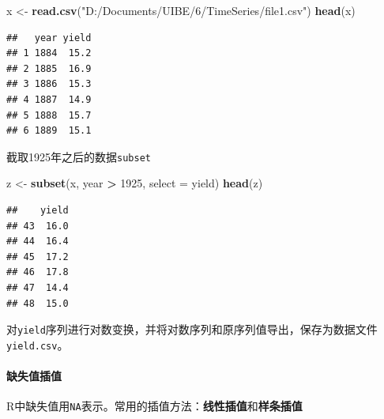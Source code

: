 \documentclass[]{article}
\newenvironment{Shaded}{\begin{snugshade}}{\end{snugshade}}
\newcommand{\CommentTok}[1]{\textcolor[rgb]{0.56,0.35,0.01}{\textit{#1}}}
\newcommand{\DataTypeTok}[1]{\textcolor[rgb]{0.13,0.29,0.53}{#1}}
\newcommand{\DecValTok}[1]{\textcolor[rgb]{0.00,0.00,0.81}{#1}}
\newcommand{\KeywordTok}[1]{\textcolor[rgb]{0.13,0.29,0.53}{\textbf{#1}}}
\newcommand{\NormalTok}[1]{#1}
\newcommand{\OperatorTok}[1]{\textcolor[rgb]{0.81,0.36,0.00}{\textbf{#1}}}
\newcommand{\StringTok}[1]{\textcolor[rgb]{0.31,0.60,0.02}{#1}}
\let\oldparagraph\paragraph
\renewcommand{\paragraph}[1]{\oldparagraph{#1}\mbox{}}
\begin{document}
\begin{Shaded}
\begin{Highlighting}[]
\NormalTok{x <-}\StringTok{ }\KeywordTok{read.csv}\NormalTok{(}\StringTok{"D:/Documents/UIBE/6/TimeSeries/file1.csv"}\NormalTok{)}
\KeywordTok{head}\NormalTok{(x)}
\end{Highlighting}
\end{Shaded}

\begin{verbatim}
##   year yield
## 1 1884  15.2
## 2 1885  16.9
## 3 1886  15.3
## 4 1887  14.9
## 5 1888  15.7
## 6 1889  15.1
\end{verbatim}

截取1925年之后的数据\texttt{subset}

\begin{Shaded}
\begin{Highlighting}[]
\NormalTok{z <-}\StringTok{ }\KeywordTok{subset}\NormalTok{(x, year }\OperatorTok{>}\StringTok{ }\DecValTok{1925}\NormalTok{, }\DataTypeTok{select =}\NormalTok{ yield)}
\KeywordTok{head}\NormalTok{(z)}
\end{Highlighting}
\end{Shaded}

\begin{verbatim}
##    yield
## 43  16.0
## 44  16.4
## 45  17.2
## 46  17.8
## 47  14.4
## 48  15.0
\end{verbatim}

对\texttt{yield}序列进行对数变换，并将对数序列和原序列值导出，保存为数据文件\texttt{yield.csv}。

\begin{Shaded}
\end{Shaded}

\hypertarget{ux7f3aux5931ux503cux63d2ux503c}{%
\paragraph{缺失值插值}\label{ux7f3aux5931ux503cux63d2ux503c}}

R中缺失值用\texttt{NA}表示。常用的插值方法：\textbf{线性插值}和\textbf{样条插值}
\end{document}
